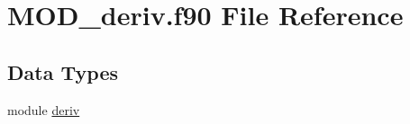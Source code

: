 \hypertarget{MOD__deriv_8f90}{\section{M\-O\-D\-\_\-deriv.\-f90 File Reference}
\label{MOD__deriv_8f90}
}
\subsection*{Data Types}
\begin{DoxyCompactItemize}
\item 
module \hyperlink{classderiv}{deriv}
\end{DoxyCompactItemize}
